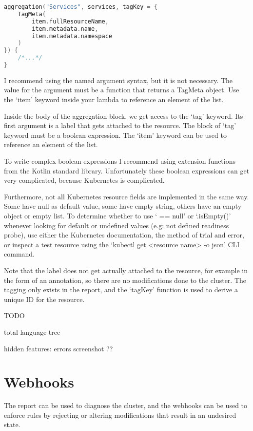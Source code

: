 \begin{lstlisting}[caption={Override tagKey},language=Kotlin,label=code:tagkey]
aggregation("Services", services, tagKey = {
    TagMeta(
        item.fullResourceName,
        item.metadata.name,
        item.metadata.namespace
    )
}) {
    /*...*/
}
\end{lstlisting}

I recommend using the named argument syntax, but it is not necessary. The value for the argument must be a function that returns a TagMeta object. Use the `item' keyword inside your lambda to reference an element of the list.

Inside the body of the aggregation block, we get access to the `tag' keyword. Its first argument is a label that gets attached to the resource. The block of `tag' keyword must be a boolean expression. The `item' keyword can be used to reference an element of the list.

To write complex boolean expressions I recommend using extension functions from the Kotlin standard library. Unfortunately these boolean expressions can get very complicated, because Kubernetes is complicated. 

Furthermore, not all Kubernetes resource fields are implemented in the same way. Some have null as default value, some have empty string, others have an empty object or empty list. To determine whether to use ` == null' or `.isEmpty()' whenever looking for default or undefined values (e.g: not defined readiness probe), use either the Kubernetes documentation, the method of trial and error, or inspect a test resource using the `kubectl get <resource name> -o json' CLI command.

Note that the label does not get actually attached to the resource, for example in the form of an annotation, so there are no modifications done to the cluster. The tagging only exists in the report, and the `tagKey' function is used to derive a unique ID for the resource.


TODO

total language tree

hidden features:
    errors 
    screenshot ??


\section{Webhooks}

The report can be used to diagnose the cluster, and the webhooks can be used to enforce rules by rejecting or altering modifications that result in an undesired state.

